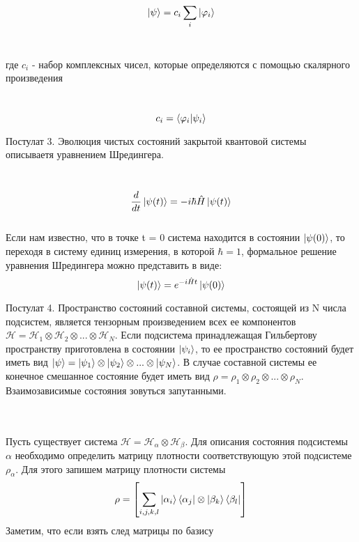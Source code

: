 \documentclass[a4paper, 10pt]{article}
\begin{document}
        \begin{equation}
            \ket{\psi}= c_i \sum_i \ket{\varphi_i}
        \end{equation}
        \\ 
        \begin{itshape}
            где $c_i$ - набор комплексных чисел, которые определяются с помощью скалярного произведения
        \end{itshape}
        \\

        \begin{equation}
            c_i = \bra{\varphi_i} \ket{\psi_i}
        \end{equation}

        
        \begin{itshape}
            Постулат 3. Эволюция чистых состояний закрытой квантовой системы описываетя уравнением Шредингера.
        \end{itshape}
        \\

        \begin{equation}
            \frac{d}{dt} \ket{\psi(t)} = -i \hbar \hat{H} \ket{\psi(t)}
        \end{equation}
        \\

        Если нам известно, что в точке t = 0 система находится в состоянии $\ket{\psi(0)}$, то переходя в систему единиц измерения, в которой $\hbar = 1$, формальное решение уравнения Шредингера можно представить в виде:
        \\
        \begin{equation}
            \ket{\psi(t)} = e^{-i\hat{H}t} \ket{\psi(0)}
        \end{equation}

        \begin{itshape}
            Постулат 4. Пространство состояний составной системы, состоящей из N числа подсистем, является тензорным произведением всех ее компонентов $\mathscr{H} = \mathscr{H}_1  \otimes  \mathscr{H}_2  \otimes ... \otimes \mathscr{H}_N$. Если подсистема принадлежащая Гильбертову пространству приготовлена в состоянии $\ket{\psi_i}$, 
            то ее пространство состояний будет иметь вид $\ket{\psi} = \ket{\psi_1}  \otimes  \ket{\psi_2}  \otimes  ... \otimes  \ket{\psi_N}$. В случае составной системы ее конечное смешанное состояние будет иметь вид $\rho = \rho_1  \otimes  \rho_2  \otimes ... \otimes \rho_N$. Взаимозависимые состояния зовуться запутанными.
        \end{itshape}
        \\
        \\
        Пусть существует система $\mathscr{H} = \mathscr{H}_\alpha \otimes \mathscr{H}_\beta$. Для описания состояния подсистемы $\alpha$ необходимо определить матрицу плотности соответствующую этой подсистеме $\rho_\alpha$. Для этого запишем матрицу плотности системы 
        \begin{equation}
            \rho = \left[\sum_{i,j,k,l} \ket{\alpha_i}\bra{\alpha_j} \otimes \ket{\beta_k} \bra{\beta_l}\right]
        \end{equation}
        Заметим, что если взять след матрицы по базису
        \newpage
\end{document}
